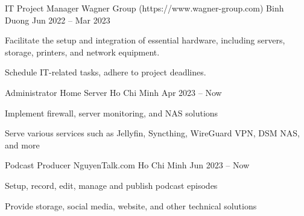 \documentclass[]{awesome-cv}
\begin{document}
\begin{cventries}
	\cventry
    {IT Project Manager}
    {Wagner Group (https://www.wagner-group.com)}
	{Binh Duong}
	{Jun 2022 – Mar 2023}
	{\begin{cvitems}
        \item {Facilitate the setup and integration of essential hardware, including servers, storage, printers, and network equipment.}
        \item {Schedule IT-related tasks, adhere to project deadlines.}
    \end{cvitems}}
	\cventry
    {Administrator}
	{Home Server}
	{Ho Chi Minh}
	{Apr 2023 – Now}
	{\begin{cvitems}
        \item {Implement firewall, server monitoring, and NAS solutions}
        \item {Serve various services such as Jellyfin, Syncthing, WireGuard VPN, DSM NAS, and more}
    \end{cvitems}}
	\cventry
	{Podcast Producer}
	{NguyenTalk.com}
	{Ho Chi Minh}
	{Jun 2023 – Now}
	{
		\begin{cvitems}
            \item {Setup, record, edit, manage and publish podcast episodes}
            \item {Provide storage, social media, website, and other technical solutions}
		\end{cvitems}
	}
\end{cventries}
\end{document}

